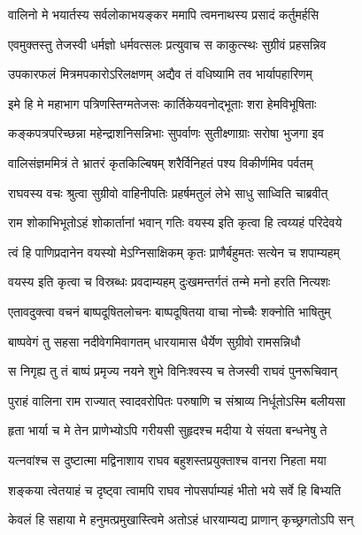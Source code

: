 \twolineshloka
{वालिनो मे भयार्तस्य सर्वलोकाभयङ्कर}
{ममापि त्वमनाथस्य प्रसादं कर्तुमर्हसि} %

\twolineshloka
{एवमुक्तस्तु तेजस्वी धर्मज्ञो धर्मवत्सलः}
{प्रत्युवाच स काकुत्स्थः सुग्रीवं प्रहसन्निव} %

\twolineshloka
{उपकारफलं मित्रमपकारोऽरिलक्षणम्}
{अद्यैव तं वधिष्यामि तव भार्यापहारिणम्} %

\twolineshloka
{इमे हि मे महाभाग पत्रिणस्तिग्मतेजसः}
{कार्तिकेयवनोद्भूताः शरा हेमविभूषिताः} %

\twolineshloka
{कङ्कपत्रपरिच्छन्ना महेन्द्राशनिसन्निभाः}
{सुपर्वाणः सुतीक्ष्णाग्राः सरोषा भुजगा इव} %

\twolineshloka
{वालिसंज्ञममित्रं ते भ्रातरं कृतकिल्बिषम्}
{शरैर्विनिहतं पश्य विकीर्णमिव पर्वतम्} %

\twolineshloka
{राघवस्य वचः श्रुत्वा सुग्रीवो वाहिनीपतिः}
{प्रहर्षमतुलं लेभे साधु साध्विति चाब्रवीत्} %

\twolineshloka
{राम शोकाभिभूतोऽहं शोकार्तानां भवान् गतिः}
{वयस्य इति कृत्वा हि त्वय्यहं परिदेवये} %

\twolineshloka
{त्वं हि पाणिप्रदानेन वयस्यो मेऽग्निसाक्षिकम्}
{कृतः प्राणैर्बहुमतः सत्येन च शपाम्यहम्} %

\twolineshloka
{वयस्य इति कृत्वा च विस्रब्धः प्रवदाम्यहम्}
{दुःखमन्तर्गतं तन्मे मनो हरति नित्यशः} %

\twolineshloka
{एतावदुक्त्वा वचनं बाष्पदूषितलोचनः}
{बाष्पदूषितया वाचा नोच्चैः शक्नोति भाषितुम्} %

\twolineshloka
{बाष्पवेगं तु सहसा नदीवेगमिवागतम्}
{धारयामास धैर्येण सुग्रीवो रामसन्निधौ} %

\twolineshloka
{स निगृह्य तु तं बाष्पं प्रमृज्य नयने शुभे}
{विनिःश्वस्य च तेजस्वी राघवं पुनरूचिवान्} %

\twolineshloka
{पुराहं वालिना राम राज्यात् स्वादवरोपितः}
{परुषाणि च संश्राव्य निर्धूतोऽस्मि बलीयसा} %

\twolineshloka
{हृता भार्या च मे तेन प्राणेभ्योऽपि गरीयसी}
{सुहृदश्च मदीया ये संयता बन्धनेषु ते} %

\twolineshloka
{यत्नवांश्च स दुष्टात्मा मद्विनाशाय राघव}
{बहुशस्तप्रयुक्ताश्च वानरा निहता मया} %

\twolineshloka
{शङ्कया त्वेतयाहं च दृष्ट्वा त्वामपि राघव}
{नोपसर्पाम्यहं भीतो भये सर्वे हि बिभ्यति} %

\twolineshloka
{केवलं हि सहाया मे हनुमत्प्रमुखास्त्विमे}
{अतोऽहं धारयाम्यद्य प्राणान् कृच्छ्रगतोऽपि सन्} %

